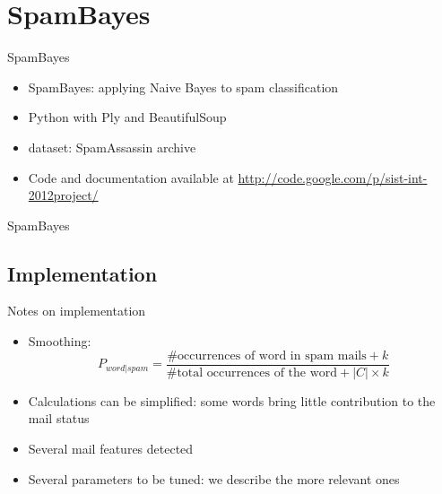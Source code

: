 \documentclass[xcolor=x11names,compress]{beamer}
\renewcommand{\(}{\begin{columns}}
\renewcommand{\)}{\end{columns}}
\newcommand{\<}[1]{\begin{column}{#1}}
\renewcommand{\>}{\end{column}}
\begin{document}
\section{SpamBayes}
\begin{frame}{SpamBayes}
  \begin{itemize}
    \item SpamBayes: applying Naive Bayes to spam classification
    \item Python with Ply and BeautifulSoup
    \item dataset: SpamAssassin archive
    \item Code and documentation available at \url{http://code.google.com/p/sist-int-2012project/}\\
  \end{itemize}
\end{frame}


\begin{frame}{SpamBayes}
  \begin{center}
  \end{center}
\end{frame}

\subsection{Implementation}
\begin{frame}{Notes on implementation}
\begin{itemize}
    \item<1->Smoothing:
      $$P_{word|spam} = \frac{\mbox{\# occurrences of word in spam mails} + k}{\mbox{\# total occurrences of the word} + |C|\times k}$$
    \item<2->Calculations can be simplified: some words bring little contribution to the mail status
    \item<3->Several mail features detected
    \item<4->Several parameters to be tuned: we describe the more relevant ones
\end{itemize}
\end{frame}

\end{document}
